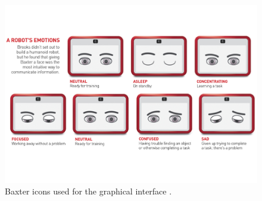 \begin{figure}
	\centering
	\includegraphics[width=\linewidth]{Fig14.pdf}
	\caption{Baxter icons used for the graphical interface \cite{baxteremojis}.}
	\label{fig:baxter-icons}
\end{figure}

